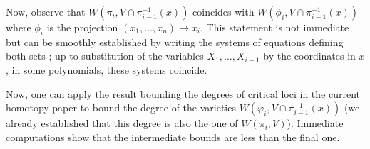 \documentclass[12pt]{article}
\begin{document}
Now, observe that $W(\pi_{i}, V\cap \pi_{i-1}^{-1}(x))$ coincides with
$W(\phi_i, V\cap \pi_{i-1}^{-1}(x))$ where $\phi_i$ is the projection
$(x_1, \ldots, x_n)\to x_i$. This statement is not immediate but can
be smoothly established by writing the systems of equations defining
both sets ; up to substitution of the variables $X_1, \ldots, X_{i-1}$
by the coordinates in $x$, in some polynomials, these systems
coincide.

Now, one can apply the result bounding the degrees of critical loci in
the current homotopy paper to bound the degree of the varieties
$W(\varphi_i, V\cap \pi_{i-1}^{-1}(x))$ (we already established that
this degree is also the one of $W(\pi_i, V)$). Immediate computations
show that the intermediate bounds are less than the final one.





  
\end{document}
